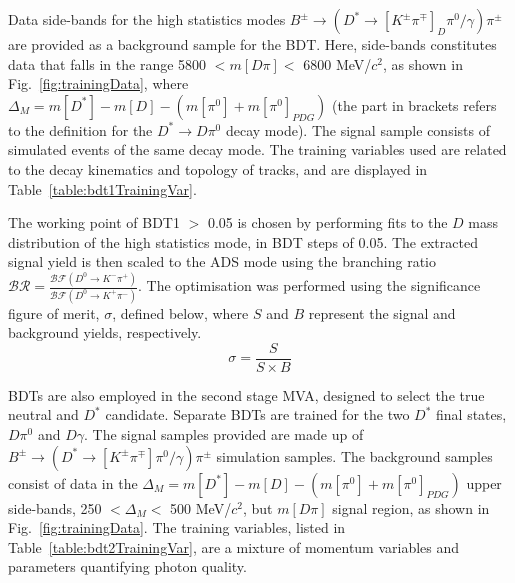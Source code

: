 \documentclass[oneside,12pt]{article}
\begin{document}
Data side-bands for the high statistics modes $B^{\pm}\rightarrow(D^{*}
\rightarrow [K^{\pm}\pi^{\mp}]_{D} \pi^0 /\gamma)\pi^{\pm}$ are provided as a
background sample for the BDT. Here, side-bands constitutes data that falls in
the range 5800 $ < m[D\pi] <$ 6800 MeV/$c^2$, as shown in
Fig.~\ref{fig:trainingData}, where $\Delta_M=m[D^{*}] - m[D]- (m[\pi^0] +
m[\pi^0]_{PDG})$ (the part in brackets refers to the definition for the
$D^*\rightarrow D\pi^0$ decay mode). The signal sample consists of simulated
events of the same decay mode. The training variables used are related to the
decay kinematics and topology of tracks, and are displayed in
Table~\ref{table:bdt1TrainingVar}. 

The working point of BDT1 $>$ 0.05 is chosen by performing fits to the $D$ mass
distribution of the high statistics mode, in BDT steps of 0.05. The extracted
signal yield is then scaled to the ADS mode using the branching ratio
$\mathcal{BR} = \frac{\mathcal{BF}(D^0 \rightarrow K^- \pi^+)}{\mathcal{BF}(D^0
\rightarrow K^+ \pi^-)}$. The optimisation was performed using the significance
figure of merit, $\sigma$, defined below, where $S$ and $B$ represent the signal
and background yields, respectively.
\begin{equation}
\sigma = \frac{S}{S \times B}
\label{D_branching_ratio}
\end{equation}

BDTs are also employed in the second stage MVA, designed to select the true
neutral and $D^*$ candidate. Separate BDTs are trained for the two $D^*$ final
states, $D\pi^0$ and $D\gamma$. The signal samples provided are made up of
$B^{\pm}\rightarrow (D^*\rightarrow [K^{\pm}\pi^{\mp}]\pi^0/\gamma)\pi^{\pm}$
simulation samples. The background samples consist of data in the
$\Delta_M=m[D^{*}] - m[D]- (m[\pi^0] + m[\pi^0]_{PDG})$ upper side-bands, 250 $
< \Delta_{M} < $ 500 MeV/$c^2$, but $m[D\pi]$ signal region, as shown in
Fig.~\ref{fig:trainingData}. The training variables, listed in
Table~\ref{table:bdt2TrainingVar}, are a mixture of momentum variables and
parameters quantifying photon quality. 
\end{document}
